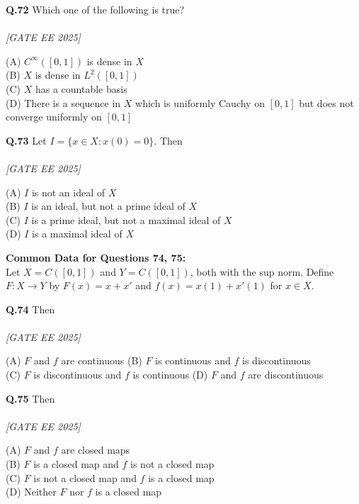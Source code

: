 \documentclass[11pt]{article}
\begin{document}
\begin{flushleft}
\textbf{Q.72} Which one of the following is true? \\
\\[1ex] \textit{[GATE EE 2025]}


(A) $C^\infty([0,1])$ is dense in $X$ \\
(B) $X$ is dense in $L^2([0,1])$ \\
(C) $X$ has a countable basis \\
(D) There is a sequence in $X$ which is uniformly Cauchy on $[0,1]$ but does not converge uniformly on $[0,1]$
\end{flushleft}

\begin{flushleft}
\textbf{Q.73} Let $I = \{ x \in X : x(0) = 0 \}$. Then \\
\\[1ex] \textit{[GATE EE 2025]}


(A) $I$ is not an ideal of $X$ \\
(B) $I$ is an ideal, but not a prime ideal of $X$ \\
(C) $I$ is a prime ideal, but not a maximal ideal of $X$ \\
(D) $I$ is a maximal ideal of $X$
\end{flushleft}

\begin{flushleft}
\textbf{Common Data for Questions 74, 75:} \\
Let $X = C([0,1])$ and $Y = C([0,1])$, both with the sup norm. Define $F: X \to Y$ by $F(x) = x + x'$
and $f(x) = x(1) + x'(1)$ for $x \in X$.
\end{flushleft}

\begin{flushleft}
\textbf{Q.74} Then \\
\\[1ex] \textit{[GATE EE 2025]}

(A) $F$ and $f$ are continuous \hspace{2em}
(B) $F$ is continuous and $f$ is discontinuous \\
(C) $F$ is discontinuous and $f$ is continuous \hspace{2em}
(D) $F$ and $f$ are discontinuous
\end{flushleft}

\begin{flushleft}
\textbf{Q.75} Then \\
\\[1ex] \textit{[GATE EE 2025]}

(A) $F$ and $f$ are closed maps \\
(B) $F$ is a closed map and $f$ is not a closed map \\
(C) $F$ is not a closed map and $f$ is a closed map \\
(D) Neither $F$ nor $f$ is a closed map
\end{flushleft}
\end{document}
